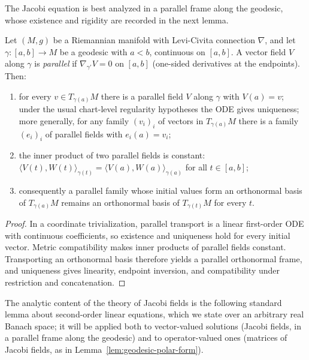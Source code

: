 The Jacobi equation is best analyzed in a parallel frame along the
geodesic, whose existence and rigidity are recorded in the next
lemma.

\begin{lemma}
\label{lem:parallel-frame}




Let $(M,g)$ be a Riemannian manifold with Levi-Civita connection
$\nabla$, and let $\gamma\colon[a,b]\to M$ be a geodesic with $a<b$,
continuous on $[a,b]$. A vector field
$V$ along $\gamma$ is {\em parallel} if $\nabla_{\gamma'}V=0$ on
$[a,b]$ (one-sided derivatives at the endpoints). Then:
\begin{enumerate}
\item for every $v\in T_{\gamma(a)}M$ there is a parallel
field $V$ along $\gamma$ with $V(a)=v$; under the usual chart-level
regularity hypotheses the ODE gives uniqueness; more generally, for any
family $(v_i)_i$ of vectors in $T_{\gamma(a)}M$ there is a family
$(e_i)_i$ of parallel fields with $e_i(a)=v_i$;
\item the inner product of two parallel fields is constant:
$\langle V(t),W(t)\rangle_{\gamma(t)}
=\langle V(a),W(a)\rangle_{\gamma(a)}$ for all $t\in[a,b]$;
\item consequently a parallel family whose initial values form an
orthonormal basis of $T_{\gamma(a)}M$ remains an orthonormal basis
of $T_{\gamma(t)}M$ for every $t$.
\end{enumerate}
\end{lemma}

\begin{proof}
\sketch
{}
In a coordinate trivialization, parallel transport is a linear first-order ODE with continuous coefficients, so existence and uniqueness hold for every initial vector. Metric compatibility makes inner products of parallel fields constant. Transporting an orthonormal basis therefore yields a parallel orthonormal frame, and uniqueness gives linearity, endpoint inversion, and compatibility under restriction and concatenation.
\end{proof}

The analytic content of the theory of Jacobi fields is the following
standard lemma about second-order linear equations, which we state
over an arbitrary real Banach space; it will be applied both to
vector-valued solutions (Jacobi fields, in a parallel frame along the
geodesic) and to operator-valued ones (matrices of Jacobi fields, as
in Lemma~\ref{lem:geodesic-polar-form}).

